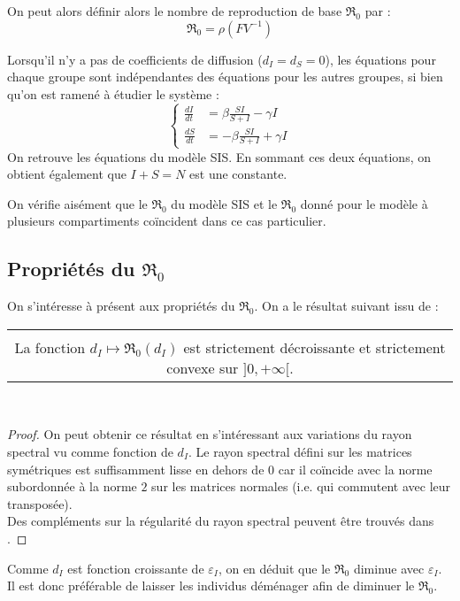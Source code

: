 \documentclass[a4paper,10.9pt]{article}
\newcommand{\R}{\mathfrak{R}_0}
\begin{document}
On peut alors définir alors le nombre de reproduction de base $\R$ par :
$$\boxed{\R=\rho(F V^{-1})}$$

Lorsqu'il n'y a pas de coefficients de diffusion ($d_I=d_S=0$), les équations pour chaque groupe sont indépendantes des équations pour les autres groupes, si bien qu'on est ramené à étudier le système :
\[
\left\{
\begin{aligned}
\frac{dI}{dt} &= \beta\frac{SI}{S+I} - \gamma I \\
\frac{dS}{dt} &= - \beta\frac{S I}{S+I} + \gamma I
\end{aligned}
\right.
\]
On retrouve les équations du modèle SIS. En sommant ces deux équations, on obtient également que $I+S=N$ est une constante. 

On vérifie aisément que le $\R$ du modèle SIS et le $\R$ donné pour le modèle à plusieurs compartiments coïncident dans ce cas particulier.
\subsection{Propriétés du $\R$}

On s'intéresse à présent aux propriétés du $\R$. On a le résultat suivant issu de \cite{GaoDong} : \\

\begin{tabular}{|c}
\begin{minipage}{\textwidth}
\textbf{Proposition} \\
La fonction $d_I \mapsto \R (d_I)$ est strictement décroissante et strictement convexe sur $]0,+ \infty[$.
\end{minipage}
\end{tabular} \\ 
 
\begin{proof}
On peut obtenir ce résultat en s'intéressant aux variations du rayon spectral vu comme fonction de $d_I$. Le rayon spectral défini sur les matrices symétriques est suffisamment lisse en dehors de $0$ car il coïncide avec la norme subordonnée à la norme $2$ sur les matrices normales (i.e. qui commutent avec leur transposée). \\

Des compléments sur la régularité du rayon spectral peuvent être trouvés dans \cite{Kloeckner2019}.
\end{proof}

Comme $d_I$ est fonction croissante de $\varepsilon_I$, on en déduit que le $\R$ diminue avec $\varepsilon_I$. Il est donc préférable de laisser les individus déménager afin de diminuer le $\R$.
\end{document}
